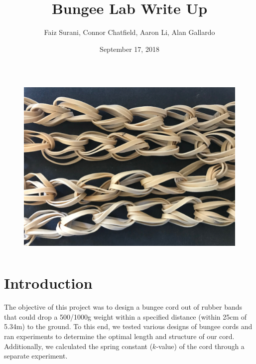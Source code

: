 \documentclass[12pt]{article}
\begin{document}
\title{Bungee Lab Write Up}
\author{Faiz Surani, Connor Chatfield, Aaron Li, Alan Gallardo}
\date{September 17, 2018}
\maketitle

\begin{figure}[h]
    \centering
    \includegraphics[width=14.5cm,height=9cm]{cordWeave}
    \label{fig:titlePagePicture}
\end{figure}
 
\section{Introduction}

The objective of this project was to design a bungee cord out of rubber bands that could drop a 500/1000g weight within a specified distance (within 25cm of 5.34m) to the ground. To this end, we tested various designs of bungee cords and ran experiments to determine the optimal length and structure of our cord. Additionally, we calculated the spring constant ($k$-value) of the cord through a separate experiment.

\newpage
\tableofcontents
\newpage
\end{document}
